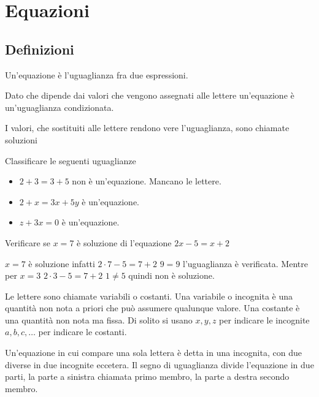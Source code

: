 \chapter{Equazioni}
\label{sec:equazioni}
\section{Definizioni}
\begin{definizionet}{}{}
Un'equazione è l'uguaglianza fra due espressioni.
\end{definizionet}
 Dato che dipende dai valori che vengono assegnati alle lettere un'equazione è un'uguaglianza condizionata.
\begin{definizionet}{}{}
  I valori, che sostituiti alle lettere rendono vere l'uguaglianza,  sono chiamate soluzioni
\end{definizionet}
\begin{esempiot}{}{}
Classificare le seguenti uguaglianze
\end{esempiot}
\begin{itemize}
\item $2+3=3+5$ non è un'equazione. Mancano le lettere.
\item $2+x=3x+5y$ è un'equazione. 
\item $z+3x=0$ è un'equazione.
\end{itemize}
\begin{esempiot}{}{}
Verificare se $x=7$ è soluzione di
 l'equazione $2x-5=x+2$ 
\end{esempiot} 
 $x=7$ è soluzione infatti $2\cdot 7-5=7+2$ $9=9$ l'uguaglianza è verificata. Mentre per $x=3$ $2\cdot 3-5=7+2$ $1\neq5$ quindi non è soluzione.

Le lettere sono chiamate variabili o costanti. Una variabile o incognita è una quantità non nota a priori che può assumere qualunque valore. Una costante è una quantità non nota ma fissa. Di solito si usano $x,y,z$ per indicare le incognite $a,b,c,\dots$ per indicare le costanti.  

Un'equazione in cui compare una sola lettera è detta in una incognita, con due diverse in due incognite eccetera. Il segno di uguaglianza divide l'equazione in due parti, la parte a sinistra chiamata primo membro, la parte a destra secondo membro.
